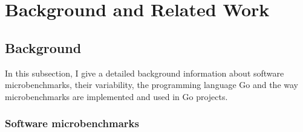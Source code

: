 \documentclass{seal_thesis}
\begin{document}
\chapter{Background and Related Work}
\label{Background and Related Work}

\section{Background}

In this subsection, I give a detailed background information about software microbenchmarks, their variability, the programming language Go and the way microbenchmarks are implemented and used in Go projects.

\subsection{Software microbenchmarks}
\end{document}
